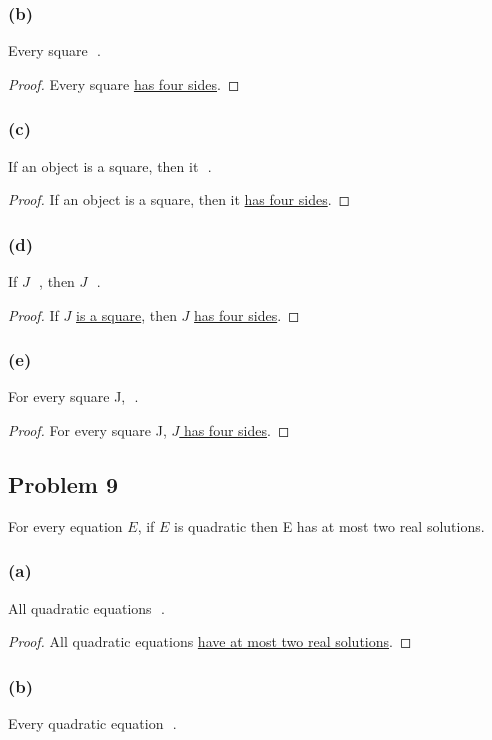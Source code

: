 \documentclass[14pt]{extarticle}
\newcommand{\fbl}{\underline{\hspace{1cm}}\,\,}
\begin{document}
\subsubsection{(b)}
Every square \fbl.

\begin{proof}
Every square \underline{has four sides}.
\end{proof}

\subsubsection{(c)}
If an object is a square, then it \fbl.

\begin{proof}
If an object is a square, then it \underline{has four sides}.
\end{proof}

\subsubsection{(d)}
If $J$ \fbl, then $J$ \fbl.

\begin{proof}
If $J$ \underline{is a square}, then $J$ \underline{has four sides}.
\end{proof}

\subsubsection{(e)}
For every square J, \fbl.

\begin{proof}
For every square J, \underline{$J$ has four sides}.
\end{proof}

\subsection{Problem 9}
For every equation $E$, if $E$ is quadratic then E has at most two real
solutions.

\subsubsection{(a)}
All quadratic equations \fbl.

\begin{proof}
All quadratic equations \underline{have at most two real solutions}.
\end{proof}

\subsubsection{(b)}
Every quadratic equation \fbl.
\end{document}
